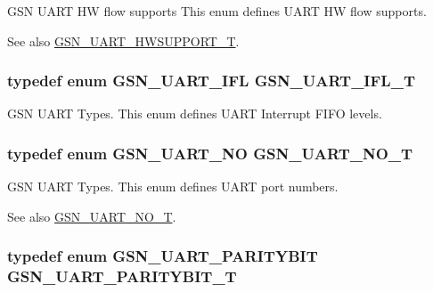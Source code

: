 GSN UART HW flow supports This enum defines UART HW flow supports. 

\begin{DoxySeeAlso}{See also}
\hyperlink{a00656_gaf4df97392dfefed655a81fe500a74162}{GSN\_\-UART\_\-HWSUPPORT\_\-T}. 
\end{DoxySeeAlso}
\hypertarget{a00656_ga170d0f1af6abfe39aa2dc0586412a85c}{
\subsubsection[{GSN\_\-UART\_\-IFL\_\-T}]{\setlength{\rightskip}{0pt plus 5cm}typedef enum {\bf GSN\_\-UART\_\-IFL} {\bf GSN\_\-UART\_\-IFL\_\-T}}}
\label{a00656_ga170d0f1af6abfe39aa2dc0586412a85c}


GSN UART Types. This enum defines UART Interrupt FIFO levels. 

\hypertarget{a00656_ga2e91880e4d139a83add2ffc3a75ad653}{
\subsubsection[{GSN\_\-UART\_\-NO\_\-T}]{\setlength{\rightskip}{0pt plus 5cm}typedef enum {\bf GSN\_\-UART\_\-NO} {\bf GSN\_\-UART\_\-NO\_\-T}}}
\label{a00656_ga2e91880e4d139a83add2ffc3a75ad653}


GSN UART Types. This enum defines UART port numbers. 

\begin{DoxySeeAlso}{See also}
\hyperlink{a00656_ga2e91880e4d139a83add2ffc3a75ad653}{GSN\_\-UART\_\-NO\_\-T}. 
\end{DoxySeeAlso}
\hypertarget{a00656_ga62f12eb4660a18fb77ba09b0625d0c8e}{
\subsubsection[{GSN\_\-UART\_\-PARITYBIT\_\-T}]{\setlength{\rightskip}{0pt plus 5cm}typedef enum {\bf GSN\_\-UART\_\-PARITYBIT}  {\bf GSN\_\-UART\_\-PARITYBIT\_\-T}}}
\label{a00656_ga62f12eb4660a18fb77ba09b0625d0c8e}



